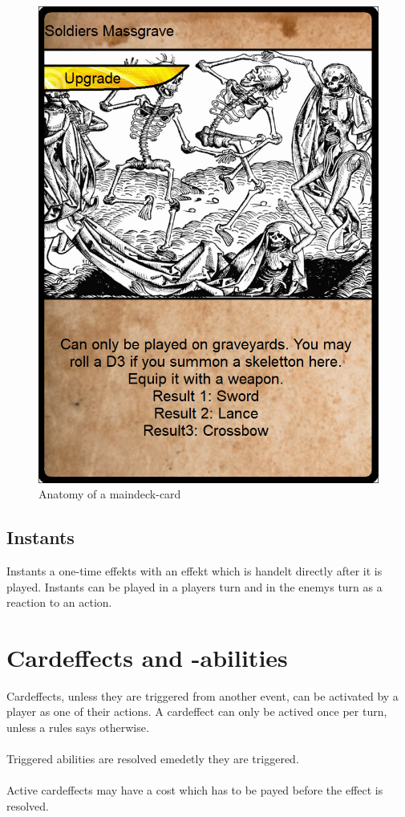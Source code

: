 \documentclass[a5paper,pagesize,10pt,bibtotoc,pointlessnumbers,
normalheadings,DIV=9,twoside=false]{scrbook}
\begin{document}
\begin{figure}[t]
\includegraphics[scale=1.0]{examplecard}
\centering
\caption{Anatomy of a maindeck-card}
\end{figure}

\subsection{Instants}
Instants a one-time effekts with an effekt which is handelt directly after it is played. Instants can be played in a players turn and in the enemys turn as a reaction to an action.\\

\newpage
\section{Cardeffects and -abilities}
Cardeffects, unless they are triggered from another event, can be activated by a player as one of their actions. A cardeffect can only be actived once per turn, unless a rules says otherwise.\\
\\
Triggered abilities are resolved emedetly they are triggered.\\
\\
Active cardeffects may have a cost which has to be payed before the effect is resolved.
\end{document}
